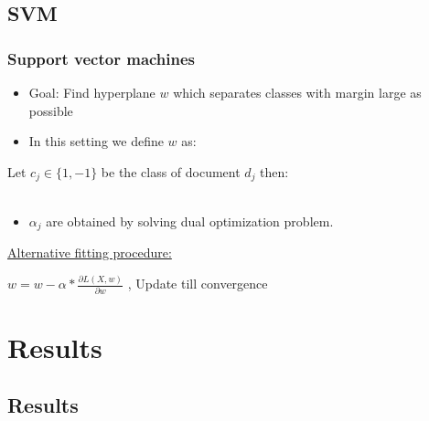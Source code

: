 \documentclass{beamer}
\begin{document}
\subsection{SVM}
\begin{frame}
	\frametitle{Support vector machines}
	\begin{itemize}
		\item Goal: Find hyperplane $w$ which separates classes with margin large as possible \pause
		\item In this setting we define $w$ as:
	\end{itemize}
	
	\begin{Definition}
		Let $c_j \in \{1,-1\}$ be the class of document $d_j$ then: \\
		 \\
	\end{Definition}
	\begin{itemize}
		\item $\alpha_{j}$ are obtained by solving dual optimization problem.
	\end{itemize}
	\pause
	\underline{Alternative fitting procedure:}
	\\
	\begin{Definition}
		\centering
		$w = w - \alpha * \frac{\partial L(X,w)}{\partial w} $ , Update till convergence
	\end{Definition}

\end{frame}
\fi

\section{Results}
\subsection{Results}
\end{document}
